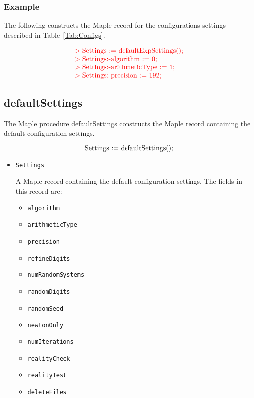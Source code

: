 \documentclass[11pt]{report}
\begin{document}
\subsubsection{Example}

The following constructs the Maple record for the
configurations settings described in Table~\ref{Tab:Configs}.

\[
\begin{color}{red}\begin{array}{l}
> \hbox{Settings := defaultExpSettings();} \\
> \hbox{Settings:-algorithm := 0;} \\
> \hbox{Settings:-arithmeticType := 1;} \\
> \hbox{Settings:-precision := 192;}
\end{array}\end{color}
\]

\subsection{defaultSettings}\label{Sec:SettingsM}

The Maple procedure defaultSettings constructs the Maple record
containing the default configuration settings.

\[
\hbox{Settings := defaultSettings();}
\]

\begin{itemize}

\item {\tt Settings}

A Maple record containing the default configuration settings.
The fields in this record are:

\begin{itemize}
  \item {\tt algorithm}
  \item {\tt arithmeticType}
  \item {\tt precision}
  \item {\tt refineDigits}
  \item {\tt numRandomSystems}
  \item {\tt randomDigits}
  \item {\tt randomSeed}
  \item {\tt newtonOnly}
  \item {\tt numIterations}
  \item {\tt realityCheck}
  \item {\tt realityTest}
  \item {\tt deleteFiles}
\end{itemize}
\end{itemize}
\end{document}
